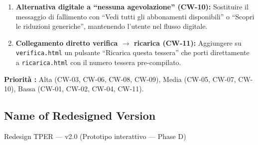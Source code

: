 \begin{tcolorbox}[colback=backgroundColor,colframe=accentGreen,arc=2mm]
\begin{enumerate}[leftmargin=*]
 \item \textbf{Alternativa digitale a ``nessuna agevolazione'' (CW-10):} Sostituire il messaggio di fallimento con ``Vedi tutti gli abbonamenti disponibili'' o ``Scopri le riduzioni generiche'', mantenendo l'utente nel flusso digitale.

 \item \textbf{Collegamento diretto verifica $\rightarrow$ ricarica (CW-11):} Aggiungere su \texttt{verifica.html} un pulsante ``Ricarica questa tessera'' che porti direttamente a \texttt{ricarica.html} con il numero tessera pre-compilato.
\end{enumerate}

\vspace{0.3cm}
\noindent\textbf{Priorità :} Alta (CW-03, CW-06, CW-08, CW-09), Media (CW-05, CW-07, CW-10), Bassa (CW-01, CW-02, CW-04, CW-11).
\end{tcolorbox}

\vspace{0.3cm}

\subsection*{Name of Redesigned Version}
\begin{tcolorbox}[colback=backgroundColor,colframe=borderColor,arc=2mm]
\small
Redesign TPER --- v2.0 (Prototipo interattivo --- Phase D)
\end{tcolorbox}



